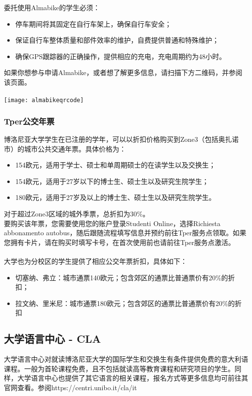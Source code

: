 委托使用Almabike的学生必须：
\begin{itemize}
 \item 停车期间将其固定在自行车架上，确保自行车安全；
 \item 保证自行车整体质量和部件效率的维护，自费提供普通和特殊维护； 
 \item 确保GPS跟踪器的正确操作，提供相应的充电，充电周期约为48小时。
\end{itemize}
如果你想参与申请Almabike，或者想了解更多信息，请扫描下方二维码，并参阅该页面。\\
\\
\texttt{[image: almabikeqrcode]}\\

\subsubsection{Tper公交年票}
博洛尼亚大学学生在已注册的学年，可以以折扣价格购买到Zone3（包括奥扎诺市）的城市公共交通年票。具体价格为：
\begin{itemize}
\item 154欧元，适用于学士、硕士和单周期硕士的在读学生以及交换生；
\item 154欧元，适用于27岁以下的博士生、硕士生以及研究生院学生；
\item 180欧元，适用于27岁及以上的博士生、硕士生以及研究生院学生。\\
\end{itemize}
对于超过Zone3区域的城外季票，总折扣为30\%。\\

要购买该年票，您需要使用您的账户登录Studenti Online，选择Richiesta abbonamento autobus，随后跟随流程填写信息并预约前往Tper服务点领取。如果您拥有卡片，请在购买时填写卡号，在首次使用前也请前往Tper服务点激活。\\
\\
大学也为分校区的学生提供了相应公交年票折扣，具体如下：
\begin{itemize}
\item 切塞纳、弗立：城市通票140欧元；包含郊区的通票比普通票价有20\%的折扣；
\item 拉文纳、里米尼：城市通票180欧元；包含郊区的通票比普通票价有20\%的折扣

\end{itemize}

\subsection{大学语言中心 - CLA}
大学语言中心对就读博洛尼亚大学的国际学生和交换生有条件提供免费的意大利语课程。一般为首轮课程免费，且不包括就读高等教育课程和研究项目的学生。同样，大学语言中心也提供了其它语言的相关课程，报名方式等更多信息均可前往其官网查看。参阅https://centri.unibo.it/cla/it\\
\\


